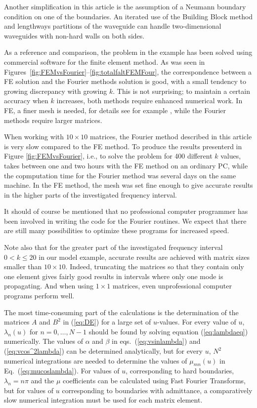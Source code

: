 \documentclass{svjour3}
\begin{document}
Another simplification in this article is the assumption of a Neumann
boundary condition on one of the boundaries. An iterated use of the
Building Block method and lengthways partitions of the waveguide can
handle two-dimensional waveguides with non-hard walls on both sides.

As a reference and comparison, the problem in the example has been
solved using commercial software for the finite element method.
As was seen in
Figures~\ref{fig:FEMvsFourier}--\ref{fig:totalfaltFEMFour}, the
correspondence between a FE solution and the Fourier methods solution
is good, with a small tendency to growing discrepancy with growing
$k$. This is not surprising; to maintain a certain accuracy when $k$
increases, both methods require enhanced numerical work. In FE, a
finer mesh is needed, for details see for example
\cite{Ihlenburg:1998}, while the Fourier methods require larger
matrices.

When working with $10\times10$ matrices, the Fourier method described
in this article is very slow compared to the FE method. To produce the
results presenterd in Figure \ref{fig:FEMvsFourier}, i.e., to solve
the problem for 400 different $k$ values, takes between one and two hours
with the FE method on an ordinary PC, while the copmputation
time for the Fourier method was several days on the same machine. In
the FE method, the mesh was set fine enough to give accurate results
in the higher parts of the investigated frequency interval.

It should of course be mentioned that no professional computer
programmer has been involved in writing the code for the Fourier
routines. We expect that there are still many possibilities to optimize
these programs for increased speed.

Note also that
for the greater part of the investigated frequency interval $0<k\le20$
in our model example, accurate results are achieved with matrix sizes
smaller than $10\times10$. Indeed,
truncating the matrices so that they contain only one
element gives fairly good results in intervals where only one
mode is propagating. And when using $1\times1$ matrices, even
unprofessional computer programs perform well.

The most time-consuming part of the calculations is the determination
of the matrices $A$ and $B^2$ in (\ref{eq:DE}) for a large set of
$u$-values. For every value of $u$, $\lambda_n(u)$ for $n=0,\dots,N-1$
should be found by solving equation (\ref{eq:lambdaeq}) numerically.
The values of $\alpha$ and $\beta$ in eqs.~(\ref{eq:vsinlambda}) and
(\ref{eq:vcos^2lambda}) can be determined analytically, but for every
$u$, $N^2$ numerical integrations are needed to determine the values
of $\mu_{mn}(u)$ in Eq.~(\ref{eq:mucoslambda}). For values of $u$,
corresponding to hard boundaries, $\lambda_n=n\pi$ and the $\mu$
coefficients can be calculated using Fast Fourier Transforms, but for
values of $u$ corresponding to boundaries with admittance, a
comparatively slow numerical integration must be used for each matrix
element.
\end{document}

